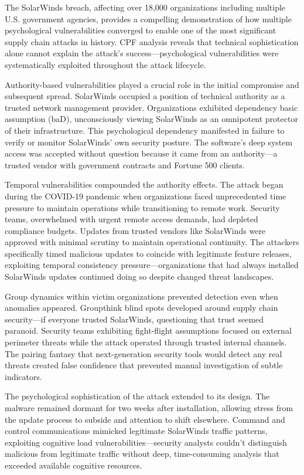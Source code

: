 \documentclass[11pt,a4paper]{article}
\begin{document}
The SolarWinds breach, affecting over 18,000 organizations including multiple U.S. government agencies, provides a compelling demonstration of how multiple psychological vulnerabilities converged to enable one of the most significant supply chain attacks in history. CPF analysis reveals that technical sophistication alone cannot explain the attack's success—psychological vulnerabilities were systematically exploited throughout the attack lifecycle.

Authority-based vulnerabilities played a crucial role in the initial compromise and subsequent spread. SolarWinds occupied a position of technical authority as a trusted network management provider. Organizations exhibited dependency basic assumption (baD), unconsciously viewing SolarWinds as an omnipotent protector of their infrastructure. This psychological dependency manifested in failure to verify or monitor SolarWinds' own security posture. The software's deep system access was accepted without question because it came from an authority—a trusted vendor with government contracts and Fortune 500 clients.

Temporal vulnerabilities compounded the authority effects. The attack began during the COVID-19 pandemic when organizations faced unprecedented time pressure to maintain operations while transitioning to remote work. Security teams, overwhelmed with urgent remote access demands, had depleted compliance budgets. Updates from trusted vendors like SolarWinds were approved with minimal scrutiny to maintain operational continuity. The attackers specifically timed malicious updates to coincide with legitimate feature releases, exploiting temporal consistency pressure—organizations that had always installed SolarWinds updates continued doing so despite changed threat landscapes.

Group dynamics within victim organizations prevented detection even when anomalies appeared. Groupthink blind spots developed around supply chain security—if everyone trusted SolarWinds, questioning that trust seemed paranoid. Security teams exhibiting fight-flight assumptions focused on external perimeter threats while the attack operated through trusted internal channels. The pairing fantasy that next-generation security tools would detect any real threats created false confidence that prevented manual investigation of subtle indicators.

The psychological sophistication of the attack extended to its design. The malware remained dormant for two weeks after installation, allowing stress from the update process to subside and attention to shift elsewhere. Command and control communications mimicked legitimate SolarWinds traffic patterns, exploiting cognitive load vulnerabilities—security analysts couldn't distinguish malicious from legitimate traffic without deep, time-consuming analysis that exceeded available cognitive resources.
\end{document}
